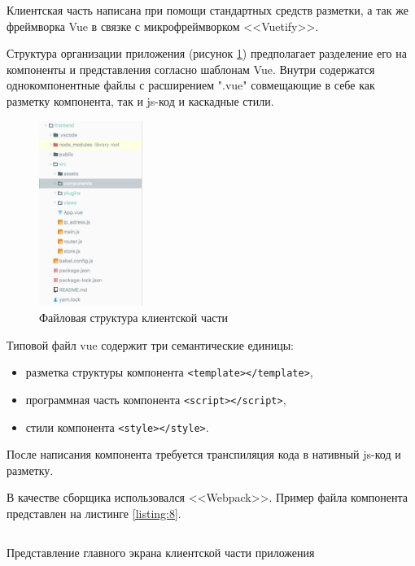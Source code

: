 Клиентская часть написана при помощи стандартных средств разметки, а так же фреймворка Vue в связке с микрофреймворком  <<Vuetify>>. 

Структура организации приложения (рисунок \ref{fig:file_tree}) предполагает разделение его на компоненты и представления согласно шаблонам Vue. Внутри содержатся однокомпонентные файлы  с расширением ".vue" совмещающие в себе как разметку компонента, так и js-код и каскадные стили. 

\begin{figure}[H]
    \centering
    \includegraphics[width=0.3\textwidth]{image/fileTree.png}
    \caption{Файловая структура клиентской части}
    \label{fig:file_tree}
\end{figure}

Типовой файл vue содержит три семантические единицы: 

\begin{itemize}
    \item разметка структуры компонента \texttt{<template></template>},
    \item программная часть компонента \texttt{<script></script>},
    \item стили компонента \texttt{<style></style>}.
\end{itemize}

После написания компонента требуется транспиляция кода в нативный js-код и разметку. 

В качестве сборщика использовался <<Webpack>>. Пример файла компонента представлен на листинге \ref{listing:8}. 

\begin{listing}[H]
   \inputminted[breaklines, breakanywhere, linenos, fontsize=\small]{html}{source/vue_comp.vue}
\caption{Представление главного экрана клиентской части приложения}
\label{listing:8}
\end{listing}

